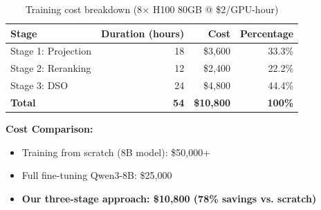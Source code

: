 \begin{table}[h]
\centering
\caption{Training cost breakdown (8$\times$ H100 80GB @ \$2/GPU-hour)}
\begin{tabular}{lrrr}
\toprule
\textbf{Stage} & \textbf{Duration (hours)} & \textbf{Cost} & \textbf{Percentage} \\
\midrule
Stage 1: Projection & 18 & \$3,600 & 33.3\% \\
Stage 2: Reranking & 12 & \$2,400 & 22.2\% \\
Stage 3: DSO & 24 & \$4,800 & 44.4\% \\
\midrule
\textbf{Total} & \textbf{54} & \textbf{\$10,800} & \textbf{100\%} \\
\bottomrule
\end{tabular}
\end{table}

\textbf{Cost Comparison:}
\begin{itemize}
\item Training from scratch (8B model): \$50,000+
\item Full fine-tuning Qwen3-8B: \$25,000
\item \textbf{Our three-stage approach: \$10,800 (78\% savings vs. scratch)}
\end{itemize}

